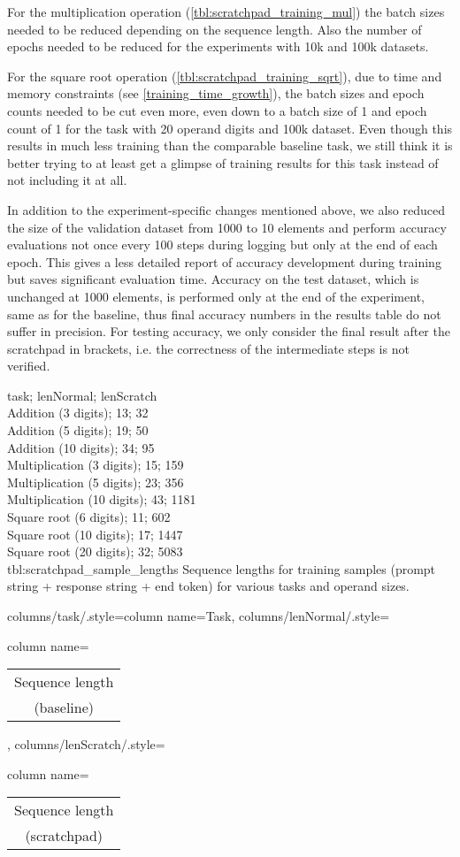 For the multiplication operation (\cref{tbl:scratchpad_training_mul}) the batch sizes needed to be reduced depending on the sequence length. Also the number of epochs needed to be reduced for the experiments with 10k and 100k datasets.

For the square root operation (\cref{tbl:scratchpad_training_sqrt}), due to time and memory constraints (see \cref{training_time_growth}), the batch sizes and epoch counts needed to be cut even more, even down to a batch size of 1 and epoch count of 1 for the task with 20 operand digits and 100k dataset. Even though this results in much less training than the comparable baseline task, we still think it is better trying to at least get a glimpse of training results for this task instead of not including it at all.

In addition to the experiment-specific changes mentioned above, we also reduced the size of the validation dataset from 1000 to 10 elements and perform accuracy evaluations not once every 100 steps during logging but only at the end of each epoch. This gives a less detailed report of accuracy development during training but saves significant evaluation time. Accuracy on the test dataset, which is unchanged at 1000 elements, is performed only at the end of the experiment, same as for the baseline, thus final accuracy numbers in the results table do not suffer in precision.
For testing accuracy, we only consider the final result after the scratchpad in brackets, i.e. the correctness of the intermediate steps is not verified.

{
	task; lenNormal; lenScratch\\
	Addition (3 digits); 13; 32 \\
	Addition (5 digits); 19; 50 \\
	Addition (10 digits); 34; 95 \\
	Multiplication (3 digits); 15; 159 \\
	Multiplication (5 digits); 23; 356 \\
	Multiplication (10 digits); 43; 1181 \\
	Square root (6 digits); 11; 602 \\
	Square root (10 digits); 17; 1447 \\
	Square root (20 digits); 32; 5083 \\
}
{tbl:scratchpad_sample_lengths}
{
	Sequence lengths for training samples (prompt string + response string + end token) for various tasks and operand sizes.
}
{%
	columns/task/.style={column name={Task}},
	columns/lenNormal/.style={column name={\begin{tabular}{c} Sequence length \\ (baseline) \\ \end{tabular}}},
	columns/lenScratch/.style={column name={\begin{tabular}{c} Sequence length \\ (scratchpad) \\ \end{tabular}}}
}



